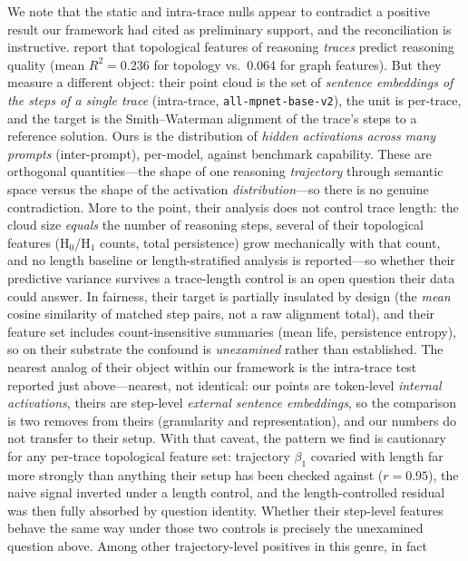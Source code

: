 \documentclass{article}
\begin{document}
We note that the static and intra-trace nulls appear to contradict a positive result our framework had
cited as preliminary support, and the reconciliation is instructive. \citet{Tan2025shape} report that topological features
of reasoning \emph{traces} predict reasoning quality (mean $R^2 = 0.236$ for topology vs.\ $0.064$ for
graph features). But they measure a different object: their point cloud is the set of \emph{sentence
embeddings of the steps of a single trace} (intra-trace, \texttt{all-mpnet-base-v2}), the unit is
per-trace, and the target is the Smith--Waterman alignment of the trace's steps to a reference
solution. Ours is the distribution of \emph{hidden activations across many prompts} (inter-prompt),
per-model, against benchmark capability. These are orthogonal quantities---the shape of one reasoning
\emph{trajectory} through semantic space versus the shape of the activation \emph{distribution}---so
there is no genuine contradiction. More to the point, their analysis does not control trace length:
the cloud size \emph{equals} the number of reasoning steps, several of their topological features
(H$_0$/H$_1$ counts, total persistence) grow mechanically with that count, and no length baseline
or length-stratified analysis is reported---so whether their predictive variance survives a
trace-length control is an open question their data could answer. In fairness, their target is
partially insulated by design (the \emph{mean} cosine similarity of matched step pairs, not a raw
alignment total), and their feature set includes count-insensitive summaries (mean life,
persistence entropy), so on their substrate the confound is \emph{unexamined} rather than
established. The nearest
analog of their object within our framework is the intra-trace test reported just above---nearest,
not identical: our points are token-level \emph{internal activations}, theirs are step-level
\emph{external sentence embeddings}, so the comparison is two removes from theirs (granularity and
representation), and our numbers do not transfer to their setup. With that caveat, the pattern we
find is cautionary for any per-trace topological feature set: trajectory $\beta_1$ covaried with
length far more strongly than anything their setup has been checked against ($r=0.95$), the naive
signal inverted under a length control, and the length-controlled residual was then fully absorbed
by question identity. Whether their step-level features behave the same way under those two controls
is precisely the unexamined question above.
Among other trajectory-level positives in this genre, \citet{reasoningTrajectories2604} in fact
\end{document}
